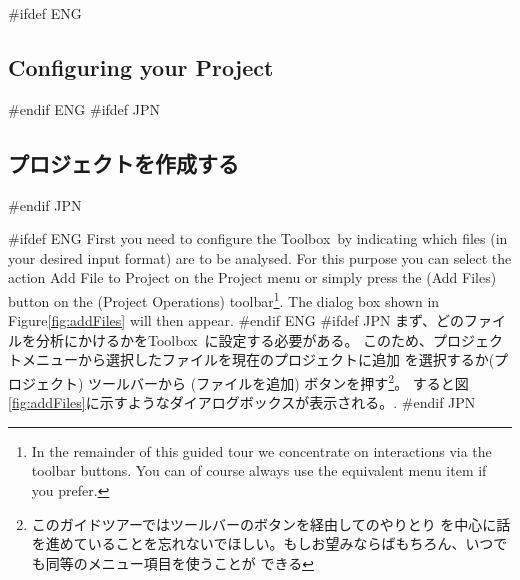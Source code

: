 \documentclass[\pformat,12pt]{article}
\newcommand{\Toolbox}{Toolbox}
\newcommand{\Toolbox}{Toolbox}
\newcommand{\guicmd}[1]{{\sf #1}}
\newcommand{\guicmd}[1]{{\gt #1}}
\begin{document}
#ifdef ENG
\subsection{Configuring your Project}
#endif ENG
#ifdef JPN
\subsection{プロジェクトを作成する}
#endif JPN

#ifdef ENG
First you need to configure the \Toolbox\ by indicating which 
files (in your desired input format) are to be analysed. For this
purpose you can select the action \guicmd{Add File to Project} on the
\guicmd{Project} menu or simply press the 
(\guicmd{Add Files}) button on the (\guicmd{Project Operations})
toolbar\footnote{In the remainder of this guided tour we concentrate
  on interactions via the toolbar buttons. You can of course always
  use the equivalent menu item if you prefer.}. The dialog box shown
in Figure\ref{fig:addFiles} will then appear.
#endif ENG
#ifdef JPN
まず、どのファイルを分析にかけるかを\Toolbox\ に設定する必要がある。
このため、プロジェクトメニューから\guicmd{選択したファイルを現在のプロジェクトに追加} を選択するか(\guicmd{プロジェクト})
ツールバーから  
(\guicmd{ファイルを追加}) ボタンを押す\footnote{このガイドツアーではツールバーのボタンを経由してのやりとり
を中心に話を進めていることを忘れないでほしい。もしお望みならばもちろん、いつでも同等のメニュー項目を使うことが
できる}。
すると図\ref{fig:addFiles}に示すようなダイアログボックスが表示される。.
#endif JPN
\end{document}
